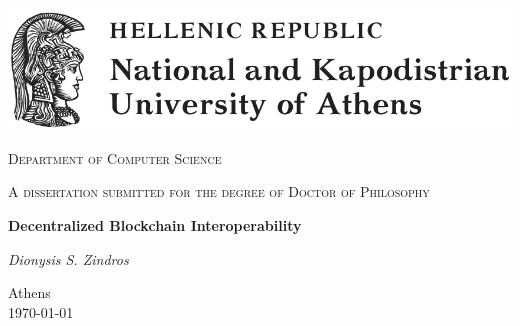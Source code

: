 \begin{titlepage}
  \centering
  \includegraphics[width=\textwidth]{chapters/preface/figures/uoa.pdf}\par\vspace{1cm}
  {\scshape\Large Department of Computer Science\par}
  \vspace{1cm}
  {\scshape A dissertation submitted for the degree of Doctor of Philosophy\par}
  \vspace{1cm}
  {\huge\bfseries Decentralized Blockchain Interoperability\par}
  \vspace{2cm}
  {\Large\itshape Dionysis \ifuniversity S. \fi Zindros\par}
	\vfill
	{\large Athens\\\today\par}
\end{titlepage}
